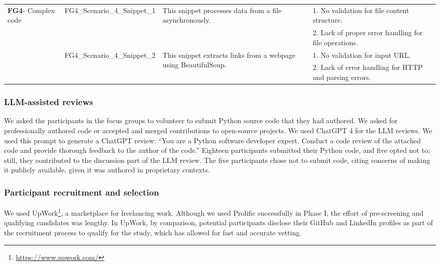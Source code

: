 {\begin{landscape}
\begin{longtable}{lp{3cm}p{7.5cm}p{6.2cm}}
        \multirow{4}{2.5cm}{\textbf{FG4}- Complex code} & \multirow{2}{3cm}{FG4\_Scenario\_4\_Snippet\_1} & \multirow{2}{8.5cm}{This snippet processes data from a file asynchronously.} & 1. No validation for file content structure.\\

        &  &  & 2. Lack of proper error handling for file operations.\\
        
        \cline{3-4}
        
        &  \multirow{2}{3cm}{FG4\_Scenario\_4\_Snippet\_2} & \multirow{2}{8.5cm}{This snippet extracts links from a webpage using BeautifulSoup.} & 1. No validation for input URL.\\

        &  &  & 2. Lack of error handling for HTTP and parsing errors.\\

        
        \bottomrule
    
    \end{longtable}

\end{landscape}

}

\subsubsection{LLM-assisted reviews} We asked the participants in the focus groups to volunteer to submit Python source code that they had authored. We asked for professionally authored code or accepted and merged contributions to open-source projects. We used ChatGPT 4 for the LLM reviews. We used this prompt to generate a ChatGPT review: ``You are a Python software developer expert. Conduct a code review of the attached code and provide thorough feedback to the author of the code.'' Eighteen participants submitted their Python code, and five opted not to; still, they contributed to the discussion part of the LLM review. The five participants chose not to submit code, citing concerns of making it publicly available, given it was authored in proprietary contexts.

\subsubsection{Participant recruitment and selection} We used UpWork\footnote{\url{https://www.upwork.com/}}, a marketplace for freelancing work. Although we used Prolific successfully in Phase I, the effort of pre-screening and qualifying candidates was lengthy. In UpWork, by comparison, potential participants disclose their GitHub and LinkedIn profiles as part of the recruitment process to qualify for the study, which has allowed for fast and accurate vetting. 

